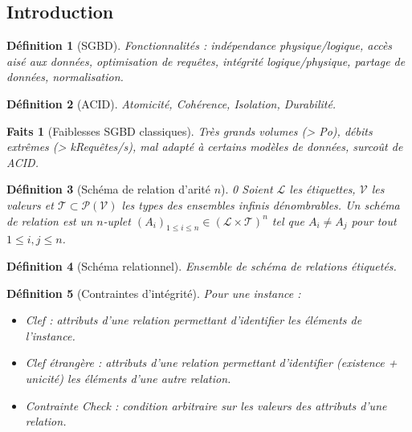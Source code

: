 \documentclass[landscape]{article}
\renewcommand{\L}{\mathscr{L}}
\newcommand{\V}{\mathscr{V}}
\newcommand{\T}{\mathscr{T}}
\renewcommand{\P}{\mathscr{P}}
\newcommand{\1}{\mathbbm{1}}
\newcommand{\0}{\mathbbm{0}}
\newtheorem{defi}{Définition}
\newtheorem{fact}{Faits}
\begin{document}
\begin{multicols}{2}

    \section{Introduction}

    \begin{defi}[SGBD] Fonctionnalités : indépendance physique/logique, accès aisé
        aux données, optimisation de requêtes, intégrité logique/physique,
        partage de données, normalisation.
    \end{defi}

    \begin{defi}[ACID] Atomicité, Cohérence, Isolation, Durabilité.
    \end{defi}

    \begin{fact}[Faiblesses SGBD classiques] Très grands volumes (> Po), débits
        extrêmes (> kRequêtes/s), mal adapté à certains modèles de données, surcoût
        de ACID.
    \end{fact}

    \begin{defi}[Schéma de relation d'arité $n$]0
        Soient $\L$ les étiquettes, $\V$ les valeurs et $\T\subset\P(\V)$ les types
        des ensembles infinis dénombrables. Un schéma de relation est un $n$-uplet
        $(A_i)_{1\leq i \leq n}\in(\L\times \T)^n$ tel que $A_i\neq A_j$ pour tout
        $1\leq i,j\leq n$.
    \end{defi}

    \begin{defi}[Schéma relationnel] Ensemble de schéma de relations étiquetés.
    \end{defi}

    \begin{defi}[Contraintes d'intégrité] Pour une instance :\begin{itemize}
        \item Clef : attributs d'une relation permettant d'identifier les
            éléments de l'instance.
        \item Clef étrangère : attributs d'une relation permettant d'identifier
            (existence + unicité) les éléments d'une autre relation.
        \item Contrainte Check : condition arbitraire sur les valeurs des attributs
            d'une relation.
    \end{itemize}\end{defi}


\end{multicols}
\end{document}
